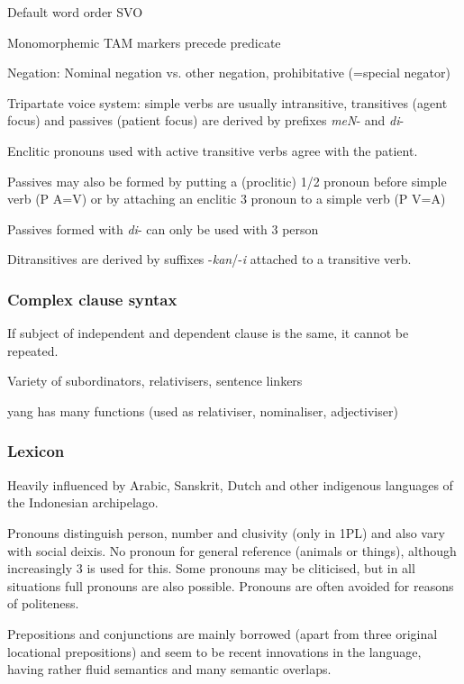 \documentclass[a4paper, 11pt]{book}
\begin{document}
\begin{itemize*}
\item  Default word order SVO
\item  Monomorphemic TAM markers precede predicate 
\item  Negation: Nominal negation vs. other negation, prohibitative (=special negator)
\item  Tripartate voice system: simple verbs are usually intransitive, transitives (agent focus) and passives (patient focus) are derived by prefixes \textit{meN}- and \textit{di}-
        \begin{itemize*}
	\item  Enclitic pronouns used with active transitive verbs agree with the patient.
	\item  Passives may also be formed by putting a (proclitic) 1/2 pronoun before simple verb (P 	A=V) 	or by attaching an enclitic 3 pronoun to a simple verb (P V=A)
	\item  Passives formed with \textit{di}- can only be used with 3 person
        \end{itemize*}
\item  Ditransitives are derived by suffixes -\textit{kan}/-\textit{i} attached to a transitive verb.
\end{itemize*}

\subsubsection*{Complex clause syntax}

\begin{itemize*}
\item  If subject of independent and dependent clause is the same, it cannot be repeated.
\item  Variety of subordinators, relativisers, sentence linkers
\item  yang has many functions (used as relativiser, nominaliser, adjectiviser)
\end{itemize*}

\subsubsection*{Lexicon}

\begin{itemize*}
\item  Heavily influenced by Arabic, Sanskrit, Dutch and other indigenous languages of the Indonesian archipelago. 
\item  Pronouns distinguish person, number and clusivity (only in 1PL) and also vary with social deixis. No pronoun for general reference (animals or things), although increasingly 3 is used for this. Some pronouns may be cliticised, but in all situations full pronouns are also possible. Pronouns are often avoided for reasons of politeness.
\item  Prepositions and conjunctions are mainly borrowed (apart from three original locational prepositions) and seem to be recent innovations in the language, having rather fluid semantics and many semantic overlaps.
\end{itemize*}
\end{document}
